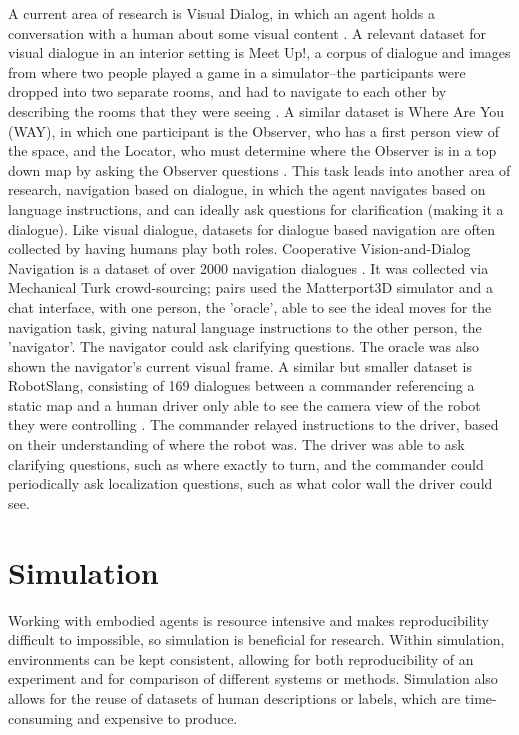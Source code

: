 A current area of research is Visual Dialog, in which an agent holds a conversation with a human about some visual content \cite{das2017}. A relevant dataset for visual dialogue in an interior setting is Meet Up!, a corpus of dialogue and images from where two people played a game in a simulator--the participants were dropped into two separate rooms, and had to navigate to each other by describing the rooms that they were seeing \cite{meetup}. A similar dataset is Where Are You (WAY), in which one participant is the Observer, who has a first person view of the space, and the Locator, who must determine where the Observer is in a top down map by asking the Observer questions \cite{whereareyou}. This task leads into another area of research, navigation based on dialogue, in which the agent navigates based on language instructions, and can ideally ask questions for clarification (making it a dialogue).  Like visual dialogue, datasets for dialogue based navigation are often collected by having humans play both roles. Cooperative Vision-and-Dialog Navigation is a dataset of over 2000 navigation dialogues \cite{thomason2019visionanddialog}. It was collected via Mechanical Turk crowd-sourcing; pairs used the Matterport3D simulator and a chat interface, with one person, the ’oracle’, able to see the ideal moves for the navigation task, giving natural language instructions to the other person, the ’navigator'. The navigator could ask clarifying questions. The oracle was also shown the navigator's current visual frame. \newline
A similar but smaller dataset is RobotSlang, consisting of 169 dialogues between a commander referencing a static map and a human driver only able to see the camera view of the robot they were controlling \cite{robotslang}. The commander relayed instructions to the driver, based on their understanding of where the robot was. The driver was able to ask clarifying questions, such as where exactly to turn, and the commander could periodically ask localization questions, such as what color wall the driver could see. \newline
\section{Simulation}
Working with embodied agents is resource intensive and makes reproducibility difficult to impossible, so simulation is beneficial for research. Within simulation, environments can be kept consistent, allowing for both reproducibility of an experiment and for comparison of different systems or methods. Simulation also allows for the reuse of datasets of human descriptions or labels, which are time-consuming and expensive to produce.


